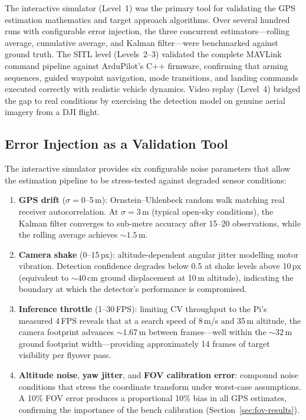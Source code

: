 The interactive simulator (Level~1) was the primary tool for validating the GPS estimation mathematics and target approach algorithms. Over several hundred runs with configurable error injection, the three concurrent estimators---rolling average, cumulative average, and Kalman filter---were benchmarked against ground truth. The SITL level (Levels~2--3) validated the complete MAVLink command pipeline against ArduPilot's C++ firmware, confirming that arming sequences, guided waypoint navigation, mode transitions, and landing commands executed correctly with realistic vehicle dynamics. Video replay (Level~4) bridged the gap to real conditions by exercising the detection model on genuine aerial imagery from a DJI flight.

\subsection{Error Injection as a Validation Tool}\label{sec:error-injection-val}

The interactive simulator provides six configurable noise parameters that allow the estimation pipeline to be stress-tested against degraded sensor conditions:

\begin{enumerate}
    \item \textbf{GPS drift} ($\sigma = 0$--5\,m): Ornstein--Uhlenbeck random walk matching real receiver autocorrelation. At $\sigma = 3$\,m (typical open-sky conditions), the Kalman filter converges to sub-metre accuracy after 15--20 observations, while the rolling average achieves ${\sim}1.5$\,m.

    \item \textbf{Camera shake} (0--15\,px): altitude-dependent angular jitter modelling motor vibration. Detection confidence degrades below 0.5 at shake levels above 10\,px (equivalent to ${\sim}40$\,cm ground displacement at 10\,m altitude), indicating the boundary at which the detector's performance is compromised.

    \item \textbf{Inference throttle} (1--30\,FPS): limiting CV throughput to the Pi's measured 4\,FPS reveals that at a search speed of 8\,m/s and 35\,m altitude, the camera footprint advances ${\sim}1.67$\,m between frames---well within the ${\sim}32$\,m ground footprint width---providing approximately 14 frames of target visibility per flyover pass.

    \item \textbf{Altitude noise}, \textbf{yaw jitter}, and \textbf{FOV calibration error}: compound noise conditions that stress the coordinate transform under worst-case assumptions. A 10\% FOV error produces a proportional 10\% bias in all GPS estimates, confirming the importance of the bench calibration (Section~\ref{sec:fov-results}).
\end{enumerate}


